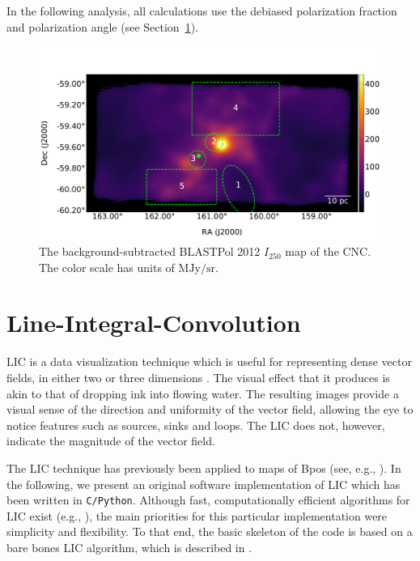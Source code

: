 In the following analysis, all calculations use the debiased polarization fraction and polarization angle (see Section~\ref{LIC}).

\begin{figure}[!htbp]
\centering
\includegraphics[width=\textwidth]{figures/carina/carina_I250}
\caption[~The background-subtracted BLASTPol 2012  map of the CNC.]{The background-subtracted BLASTPol 2012 $I_{250}$ map of the CNC\@. The color scale has units of $\mathrm{MJy}/\mathrm{sr}$.}
\label{fig:I250}
\end{figure}

\section{Line-Integral-Convolution}\label{LIC}

LIC is a data visualization technique which is useful for representing dense vector fields, in either two or three dimensions \citep{cabral1993imaging}. The visual effect that it produces is akin to that of dropping ink into flowing water. The resulting images provide a visual sense of the direction and uniformity of the vector field, allowing the eye to notice features such as sources, sinks and loops. The LIC does not, however, indicate the magnitude of the vector field.

The LIC technique has previously been applied to maps of \gls{Bpos} (see, e.g., \citet{ade2016planck}). In the following, we present an original software implementation of LIC which has been written in \texttt{C/Python}. Although fast, computationally efficient algorithms for LIC exist (e.g., \citet{stalling1995fast}), the main priorities for this particular implementation were simplicity and flexibility. To that end, the basic skeleton of the code is based on a bare bones LIC algorithm, which is described in \citet{ma1996texture}.

